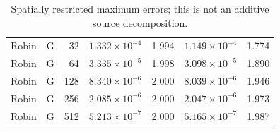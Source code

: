 \begin{table}[htbp]
\begin{tabular}{llrrrrr}
Robin & G & 32 & $1.332\times10^{-4}$ & 1.994 & $1.149\times10^{-4}$ & 1.774 \\
Robin & G & 64 & $3.335\times10^{-5}$ & 1.998 & $3.098\times10^{-5}$ & 1.890 \\
Robin & G & 128 & $8.340\times10^{-6}$ & 2.000 & $8.039\times10^{-6}$ & 1.946 \\
Robin & G & 256 & $2.085\times10^{-6}$ & 2.000 & $2.047\times10^{-6}$ & 1.973 \\
Robin & G & 512 & $5.213\times10^{-7}$ & 2.000 & $5.165\times10^{-7}$ & 1.987 \\
\bottomrule
\end{tabular}
\caption{Spatially restricted maximum errors; this is not an additive source decomposition.}
\label{tab:spatial-combined}
\end{table}
